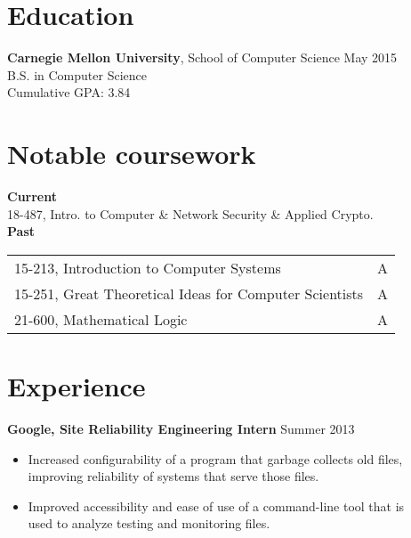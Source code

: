 \documentclass[margin]{res}
\begin{document}

\address{
  5032 Forbes Avenue SMC 6899 \\
  Pittsburgh, PA 15289-6899 \\
  (302) 468-7537
}
\address{  %
  \hfill \href{mailto:joshz@joshz.org}{joshz@joshz.org} \\
  \hfill
    \href{https://github.com/joshzimmerman}{https://github.com/joshzimmerman} \\
  \hfill \href{http://joshz.org}{http://joshz.org}
}

\begin{resume}

\section{Education}
  \textbf{Carnegie Mellon University}, School of Computer Science
    \hfill May 2015\\
  B.S. in Computer Science\\
  Cumulative GPA: 3.84

\section{Notable coursework}
  \textbf{Current}\\
  \hphantom{ } 18-487, Intro. to Computer \& Network Security \& Applied
      Crypto.\\
  \textbf{Past}\vspace{0.25em}\\
  \begin{tabular}{ll}
                     15-213, Introduction to Computer Systems & A\\
      15-251, Great Theoretical Ideas for Computer Scientists & A\\
                                   21-600, Mathematical Logic & A
  \end{tabular}

\section{Experience}
  \textbf{Google, Site Reliability Engineering Intern}
    \hfill Summer 2013
  \begin{itemize} \itemsep -2pt  %
    \item Increased configurability of a program that garbage collects old files,\\
          improving reliability of systems that serve those files.
    \item Improved accessibility and ease of use of a command-line tool that is\\
          used to analyze testing and monitoring files.
  \end{itemize}


\end{resume}
\end{document}
